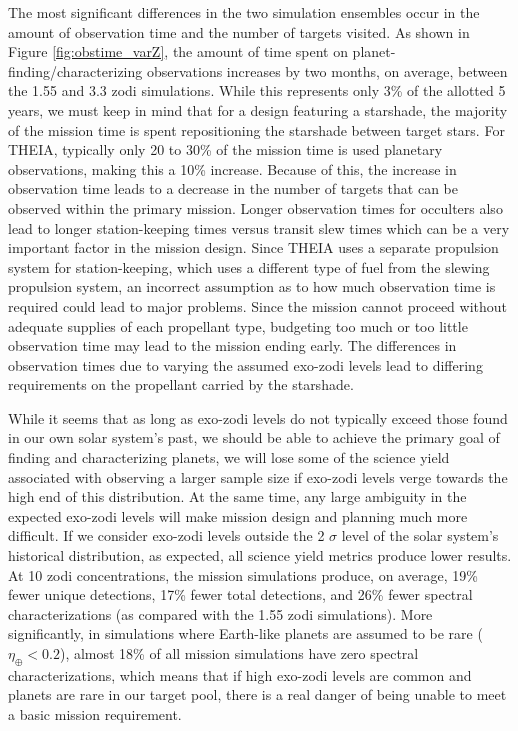  The most significant differences in the two simulation ensembles occur in the amount of observation time and the number of targets visited.  As shown in Figure \ref{fig:obstime_varZ}, the amount of time spent on planet-finding/characterizing observations increases by two months, on average, between the 1.55 and 3.3 zodi simulations.  While this represents only 3\% of the allotted 5 years, we must keep in mind that for a design featuring a starshade, the majority of the mission time is spent repositioning the starshade between target stars. For THEIA, typically only 20 to 30\% of the mission time is used planetary observations, making this a 10\% increase.  Because of this, the increase in observation time leads to a decrease in the number of targets that can be observed within the primary mission.   Longer observation times for occulters also lead to longer station-keeping times versus transit slew times which can be a very important factor in the mission design.  Since THEIA uses a separate propulsion system for station-keeping, which uses a different type of fuel from the slewing propulsion system, an incorrect assumption as to how much  observation time is required could lead to major problems.  Since the mission cannot proceed without adequate supplies of each propellant type, budgeting too much or too little observation time may lead to the mission ending early.  The differences in observation times due to varying the assumed exo-zodi levels lead to differing requirements on the propellant carried by the starshade.
  
While it seems that as long as exo-zodi levels do not typically exceed those found in our own solar system's past, we should be able to achieve the primary goal of finding and characterizing planets, we will lose some of the science yield associated with observing a larger sample size if exo-zodi levels verge towards the high end of this distribution.  At the same time, any large ambiguity in the expected exo-zodi levels will make mission design and planning much more difficult. If we consider exo-zodi levels outside the 2 $\sigma$ level of the solar system's historical distribution, as expected, all science yield metrics produce lower results.  At 10 zodi concentrations, the mission simulations produce, on average, 19\% fewer unique detections, 17\% fewer total detections, and 26\% fewer spectral characterizations (as compared with the 1.55 zodi simulations).  More significantly, in simulations where Earth-like planets are assumed to be rare ($\eta_\oplus < 0.2$), almost 18\% of all mission simulations have zero spectral characterizations, which means that if high exo-zodi levels are common and planets are rare in our target pool, there is a real danger of being unable to meet a basic mission requirement.

